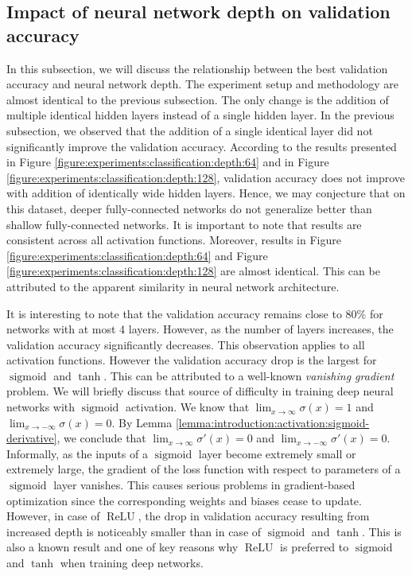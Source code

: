 \subsection{Impact of neural network depth on validation accuracy}
\label{subsection:experiments:classification:depth}
In this subsection, we will discuss the relationship between the best validation accuracy and neural network depth. The experiment setup and methodology are almost identical to the previous subsection. The only change is the addition of multiple identical hidden layers instead of a single hidden layer.
In the previous subsection, we observed that the addition of a single identical layer did not significantly improve the validation accuracy. According to the results presented in Figure \ref{figure:experiments:classification:depth:64} and in Figure \ref{figure:experiments:classification:depth:128}, validation accuracy does not improve with addition of identically wide hidden layers. Hence, we may conjecture that on this dataset, deeper fully-connected networks do not generalize better than shallow fully-connected networks. It is important to note that results are consistent across all activation functions. 
Moreover, results in Figure \ref{figure:experiments:classification:depth:64} and Figure \ref{figure:experiments:classification:depth:128} are almost identical. This can be attributed to the apparent similarity in neural network architecture.

It is interesting to note that the validation accuracy remains close to $80 \%$ for networks with at most 4 layers. However, as the number of layers increases, the validation accuracy significantly decreases. This observation applies to all activation functions. However the validation accuracy drop is the largest for $\operatorname{sigmoid}$ and $\tanh$. This can be attributed to a well-known \textit{vanishing gradient} problem. We will briefly discuss that source of difficulty in training deep neural networks with $\operatorname{sigmoid}$ activation. We know that $\lim_{x \to \infty} \sigma (x) = 1$ and $\lim_{x \to -\infty} \sigma (x) = 0$. By Lemma \ref{lemma:introduction:activation:sigmoid-derivative}, we conclude that $\lim_{x \to \infty} \sigma'(x) = 0$ and $\lim_{x \to -\infty} \sigma'(x) = 0$. Informally, as the inputs of a $\operatorname{sigmoid}$ layer become extremely small or extremely large, the gradient of the loss function with respect to parameters of a $\operatorname{sigmoid}$ layer vanishes. This causes serious problems in gradient-based optimization since the corresponding weights and biases cease to update. However, in case of $\operatorname{ReLU}$, the drop in validation accuracy resulting from increased depth is noticeably smaller than in case of $\operatorname{sigmoid}$ and $\tanh$. This is also a known result and one of key reasons why $\operatorname{ReLU}$ is preferred to $\operatorname{sigmoid}$ and $\tanh$ when training deep networks.

